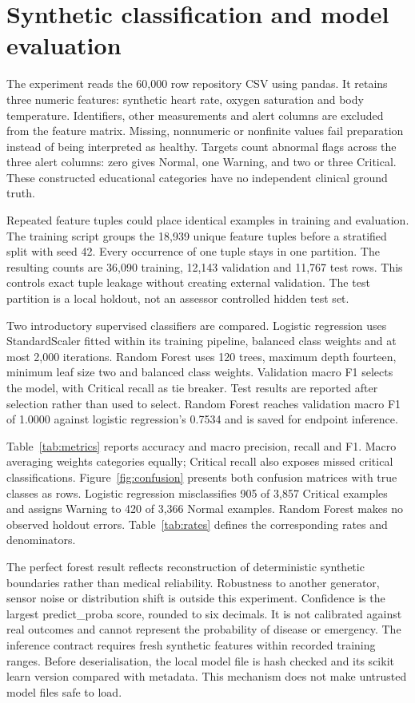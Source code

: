 \section{Synthetic classification and model evaluation}
\label{sec:ml}
\begin{reportprose}
The experiment reads the 60,000 row repository CSV using pandas. It retains three numeric features: synthetic heart rate, oxygen saturation and body temperature. Identifiers, other measurements and alert columns are excluded from the feature matrix. Missing, nonnumeric or nonfinite values fail preparation instead of being interpreted as healthy. Targets count abnormal flags across the three alert columns: zero gives Normal, one Warning, and two or three Critical. These constructed educational categories have no independent clinical ground truth.\cite{mlartifact}

Repeated feature tuples could place identical examples in training and evaluation. The training script groups the 18,939 unique feature tuples before a stratified split with seed 42. Every occurrence of one tuple stays in one partition. The resulting counts are 36,090 training, 12,143 validation and 11,767 test rows. This controls exact tuple leakage without creating external validation. The test partition is a local holdout, not an assessor controlled hidden test set.

Two introductory supervised classifiers are compared. Logistic regression uses StandardScaler fitted within its training pipeline, balanced class weights and at most 2,000 iterations. Random Forest uses 120 trees, maximum depth fourteen, minimum leaf size two and balanced class weights. Validation macro F1 selects the model, with Critical recall as tie breaker. Test results are reported after selection rather than used to select. Random Forest reaches validation macro F1 of 1.0000 against logistic regression's 0.7534 and is saved for endpoint inference.

Table~\ref{tab:metrics} reports accuracy and macro precision, recall and F1. Macro averaging weights categories equally; Critical recall also exposes missed critical classifications.\cite{sklearn} Figure~\ref{fig:confusion} presents both confusion matrices with true classes as rows. Logistic regression misclassifies 905 of 3,857 Critical examples and assigns Warning to 420 of 3,366 Normal examples. Random Forest makes no observed holdout errors. Table~\ref{tab:rates} defines the corresponding rates and denominators.

The perfect forest result reflects reconstruction of deterministic synthetic boundaries rather than medical reliability. Robustness to another generator, sensor noise or distribution shift is outside this experiment. Confidence is the largest predict\_proba score, rounded to six decimals. It is not calibrated against real outcomes and cannot represent the probability of disease or emergency. The inference contract requires fresh synthetic features within recorded training ranges. Before deserialisation, the local model file is hash checked and its scikit learn version compared with metadata. This mechanism does not make untrusted model files safe to load.


\end{reportprose}
